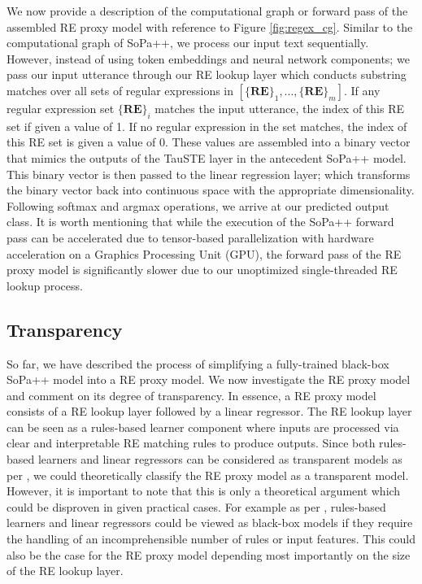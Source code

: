 We now provide a description of the computational graph or forward pass of the
assembled RE proxy model with reference to Figure \ref{fig:regex_cg}. Similar to
the computational graph of SoPa++, we process our input text sequentially.
However, instead of using token embeddings and neural network components; we
pass our input utterance through our RE lookup layer which conducts substring
matches over all sets of regular expressions in $[\{\textbf{RE}\}_1, \ldots,
\{\textbf{RE}\}_m]$. If any regular expression set $\{\textbf{RE}\}_i$ matches
the input utterance, the index of this RE set if given a value of 1. If no
regular expression in the set matches, the index of this RE set is given a value
of 0. These values are assembled into a binary vector that mimics the outputs of
the TauSTE layer in the antecedent SoPa++ model. This binary vector is then
passed to the linear regression layer; which transforms the binary vector back
into continuous space with the appropriate dimensionality. Following softmax and
argmax operations, we arrive at our predicted output class. It is worth
mentioning that while the execution of the SoPa++ forward pass can be
accelerated due to tensor-based parallelization with hardware acceleration on a
Graphics Processing Unit (GPU), the forward pass of the RE proxy model is
significantly slower due to our unoptimized single-threaded RE lookup process.

\subsection{Transparency}

\label{sec:re_transparency}

So far, we have described the process of simplifying a fully-trained black-box
SoPa++ model into a RE proxy model. We now investigate the RE proxy model and
comment on its degree of transparency. In essence, a RE proxy model consists of
a RE lookup layer followed by a linear regressor. The RE lookup layer can be
seen as a rules-based learner component where inputs are processed via clear and
interpretable RE matching rules to produce outputs. Since both rules-based
learners and linear regressors can be considered as transparent models as per
\citet[Page 7, Section 3]{arrieta2020explainable}, we could theoretically
classify the RE proxy model as a transparent model. However, it is important to
note that this is only a theoretical argument which could be disproven in given
practical cases. For example as per \citet[Page 9, Table
2]{arrieta2020explainable}, rules-based learners and linear regressors could be
viewed as black-box models if they require the handling of an incomprehensible
number of rules or input features. This could also be the case for the RE proxy
model depending most importantly on the size of the RE lookup layer.

